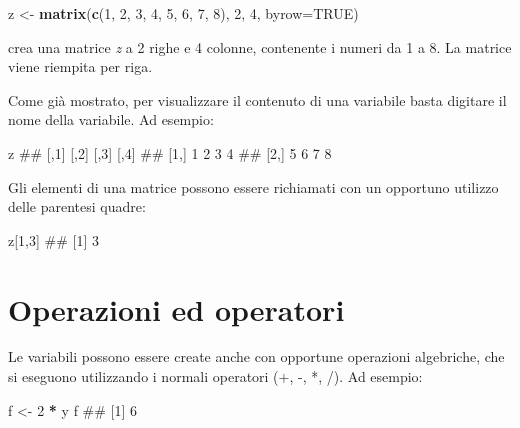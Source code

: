 \documentclass[a4paper,12pt,oneside]{book}
\newenvironment{Shaded}{\begin{snugshade}}{\end{snugshade}}
\newcommand{\KeywordTok}[1]{\textcolor[rgb]{0.13,0.29,0.53}{\textbf{#1}}}
\newcommand{\DataTypeTok}[1]{\textcolor[rgb]{0.13,0.29,0.53}{#1}}
\newcommand{\DecValTok}[1]{\textcolor[rgb]{0.00,0.00,0.81}{#1}}
\newcommand{\StringTok}[1]{\textcolor[rgb]{0.31,0.60,0.02}{#1}}
\newcommand{\OtherTok}[1]{\textcolor[rgb]{0.56,0.35,0.01}{#1}}
\newcommand{\OperatorTok}[1]{\textcolor[rgb]{0.81,0.36,0.00}{\textbf{#1}}}
\newcommand{\NormalTok}[1]{#1}
\theoremstyle{definition}
\theoremstyle{definition}
\theoremstyle{definition}
\theoremstyle{remark}
\begin{document}
\begin{Shaded}
\begin{Highlighting}[]
\NormalTok{z  <-}\StringTok{  }\KeywordTok{matrix}\NormalTok{(}\KeywordTok{c}\NormalTok{(}\DecValTok{1}\NormalTok{, }\DecValTok{2}\NormalTok{, }\DecValTok{3}\NormalTok{, }\DecValTok{4}\NormalTok{, }\DecValTok{5}\NormalTok{, }\DecValTok{6}\NormalTok{, }\DecValTok{7}\NormalTok{, }\DecValTok{8}\NormalTok{), }\DecValTok{2}\NormalTok{, }\DecValTok{4}\NormalTok{, }\DataTypeTok{byrow=}\OtherTok{TRUE}\NormalTok{)}
\end{Highlighting}
\end{Shaded}

crea una matrice \emph{z} a 2 righe e 4 colonne, contenente i numeri da
1 a 8. La matrice viene riempita per riga.

Come già mostrato, per visualizzare il contenuto di una variabile basta
digitare il nome della variabile. Ad esempio:

\begin{Shaded}
\begin{Highlighting}[]
\NormalTok{z}
\NormalTok{##      [,1] [,2] [,3] [,4]}
\NormalTok{## [1,]    1    2    3    4}
\NormalTok{## [2,]    5    6    7    8}
\end{Highlighting}
\end{Shaded}

Gli elementi di una matrice possono essere richiamati con un opportuno
utilizzo delle parentesi quadre:

\begin{Shaded}
\begin{Highlighting}[]
\NormalTok{z[}\DecValTok{1}\NormalTok{,}\DecValTok{3}\NormalTok{]}
\NormalTok{## [1] 3}
\end{Highlighting}
\end{Shaded}

\section*{Operazioni ed operatori}\label{operazioni-ed-operatori}

Le variabili possono essere create anche con opportune operazioni
algebriche, che si eseguono utilizzando i normali operatori (+, -, *,
/). Ad esempio:

\begin{Shaded}
\begin{Highlighting}[]
\NormalTok{f  <-}\StringTok{  }\DecValTok{2} \OperatorTok{*}\StringTok{ }\NormalTok{y}
\NormalTok{f}
\NormalTok{## [1] 6}
\end{Highlighting}
\end{Shaded}
\end{document}
